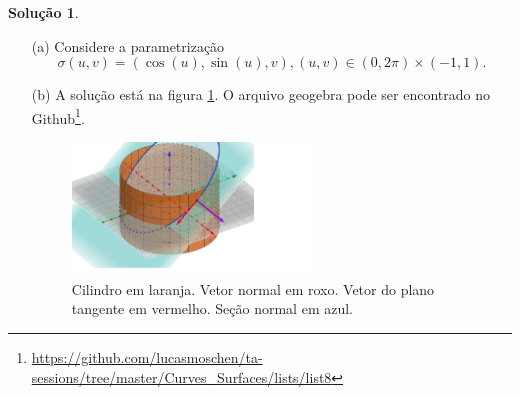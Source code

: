\documentclass[a4paper,12pt]{article}
\theoremstyle{exer}
\theoremstyle{definition}
\newtheorem{solution}{Solução}
\theoremstyle{plain}
\begin{document}
\begin{solution}
    \begin{enumerate}
        \item[(a)] Considere a parametrização 
        $$\sigma(u,v) = (\cos(u),
        \sin(u), v), (u,v) \in (0,2\pi) \times (-1,1).$$ 
        \item[(b)] A solução está na figura \ref{fig:cylinder}. O arquivo
        geogebra pode ser encontrado no Github\footnote{\url{https://github.com/lucasmoschen/ta-sessions/tree/master/Curves_Surfaces/lists/list8}}.

        \begin{figure}[!ht]
            \centering
            \includegraphics[width=0.6\textwidth]{images/cilindro.png}
            \caption{Cilindro em laranja. Vetor normal em roxo. Vetor do plano tangente em vermelho. Seção normal em azul.}
            \label{fig:cylinder}
        \end{figure}


\end{enumerate}
\end{solution}
\end{document}
